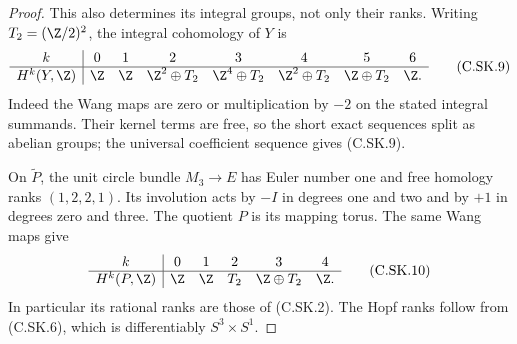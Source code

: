 \begin{proof}
This also determines its integral groups,
not only their ranks. Writing $T_2=(\Z/2)^2$,
the integral cohomology of $Y$ is
\[
 \begin{array}{c|ccccccc}
 k&0&1&2&3&4&5&6\\ \hline
 H^k(Y,\Z)&
 \Z&\Z&\Z^2\oplus T_2&\Z^4\oplus T_2&
 \Z^2\oplus T_2&\Z\oplus T_2&\Z .
 \end{array}                                             \tag{C.SK.9}
\]
Indeed the Wang maps are zero or multiplication
by $-2$ on the stated integral summands.
Their kernel terms are free, so the short
exact sequences split as abelian groups;
the universal coefficient sequence gives
(C.SK.9).

On $\widetilde P$, the unit circle bundle
$M_3\to E$ has Euler number one and free
homology ranks $(1,2,2,1)$. Its involution
acts by $-I$ in degrees one and two and
by $+1$ in degrees zero and three.
The quotient $P$ is its mapping torus.
The same Wang maps give
\[
 \begin{array}{c|ccccc}
 k&0&1&2&3&4\\ \hline
 H^k(P,\Z)&
 \Z&\Z&T_2&\Z\oplus T_2&\Z .
 \end{array}                                             \tag{C.SK.10}
\]
In particular its rational ranks are those
of (C.SK.2). The Hopf ranks follow from
(C.SK.6), which is differentiably
$S^3\times S^1$.


\end{proof}
